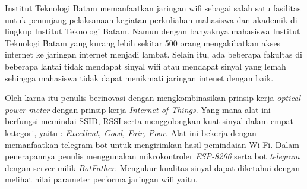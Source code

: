 \documentclass[conference]{IEEEtran}
\begin{document}
Institut Teknologi Batam memanfaatkan jaringan wifi sebagai salah satu fasilitas untuk penunjang pelaksanaan kegiatan perkuliahan mahasiswa dan akademik di lingkup Institut Teknologi Batam. Namun dengan banyaknya mahasiswa Institut Teknologi Batam yang kurang lebih sekitar 500 orang mengakibatkan akses internet ke jaringan internet menjadi lambat. Selain itu, ada beberapa fakultas di beberapa lantai tidak mendapat sinyal wifi atau mendapat sinyal yang lemah sehingga mahasiswa tidak dapat menikmati jaringan intenet dengan baik.

Oleh karna itu penulis berinovasi dengan mengkombinasikan prinsip kerja \textit{optical power meter} dengan prinsip kerja \textit{Internet of Things}. Yang mana alat ini berfungsi memindai SSID, RSSI serta menggolongkan kuat sinyal dalam empat kategori, yaitu : \textit{Excellent, Good, Fair, Poor}. Alat ini bekerja dengan memanfaatkan telegram bot untuk mengirimkan hasil pemindaian Wi-Fi. Dalam penerapannya penulis menggunakan mikrokontroler \textit{ESP-8266} serta bot \textit{telegram} dengan server milik \textit{BotFather}. Mengukur kualitas sinyal dapat diketahui dengan melihat nilai parameter performa jaringan wifi yaitu,
\end{document}
